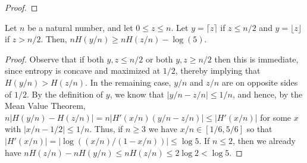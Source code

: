 \documentclass[final, 12pt]{colt2018}
\theoremstyle{definition}
\theoremstyle{plain}
\begin{document}
\begin{proof}
\begin{comment}
By Lemma~\ref{lemma:entropy-rounding}
we know that %
\[ \sum_a |V_a| (H(y_a/|V_a|) - H(z_a)) \le 2^{2s} \log 5. \]
Also we have from our bound on $|d_i|$ that
\begin{align*}
\sum_i |d_i| |r'(y) c'(y) - r'(zn)c'(zn)| 
&\le \sum_i |d_i| (|r'(y)||c'(y) - c'(zn)| + |c'(zn)||r'(y) - r'(zn)|) \\
&\le \sum_i 4|d_i|n \le \frac{4\sqrt{27} s J_T}{n \sqrt{\Delta}}
\end{align*}
Similar to above we see by Lemma~\ref{lemma:gamma-def} our bound on $|d_i|$ that
\begin{align*}
\sum_i d_i|r'(y) c'(y) - r' c'| 
&\le \sum_i d_i|r'(zn) c'(zn) - r' c'| + \sum_i d_i |r'(y) c'(y) - r'(zn)c'(zn)| \\
&\le \epsilon J_T/2 + \frac{4\sqrt{27} s J_T}{n \sqrt{\Delta}}
\end{align*}
and so by \eqref{z''-below}
\begin{align*}
\log M
&\le \sum_i r'(y)_i c'(y)_i d_i + \sum_a |V_a| H(y_a/V_a) + \epsilon J_T/2 + \frac{4\sqrt{27} s J_T}{n \sqrt{\Delta}} + O(2^{2s}) \\
&\le \log Z'' + \epsilon J_T/2 + \frac{4\sqrt{27} s J_T}{n \sqrt{\Delta}} + O(2^{2s})
\end{align*}

Combining our bounds on $\log M$ we find that
\[ |\log M - \log Z''| \le \epsilon J_T/2 + \frac{4\sqrt{27} s J_T}{n \sqrt{\Delta}}| + O(2^{2s}\log n) + \lambda n. \]
Finally if $n \ge \frac{8 \sqrt{27} s}{\sqrt{\Delta} \epsilon}$ then $\frac{4\sqrt{27} s J_T}{n \sqrt{\Delta}}| \le \epsilon J_T/2$
so we get our desired result.
\end{comment}
\end{proof}
\begin{lemma}\label{lemma:entropy-rounding}
Let $n$ be a natural number, and let $0 \le z \le n$. Let $y = \lceil z \rceil$ if $z \le n/2$
and $y = \lfloor z \rfloor$ if $z > n/2$. Then,
$nH(y/n) \ge nH(z/n) - \log(5)$.
\end{lemma}
\begin{proof}
Observe that if both $y,z \le n/2$ or both $y,z \ge n/2$ then
this is immediate, since entropy is concave and maximized at $1/2$, thereby implying that $H(y/n) > H(z/n)$. In the remaining case, $y/n$ and $z/n$ are on opposite
sides of $1/2$. By the definition of $y$, we know that $|y/n - z/n| \le 1/n$, and hence, by the Mean Value Theorem, $n|H(y/n) - H(z/n)| = n|H'(x/n)(y/n - z/n)| \le |H'(x/n)|$ for some $x$ with $|x/n - 1/2| \le 1/n$.  Thus, if $n \ge 3$ we have $x/n \in [1/6,5/6]$ so that
$|H'(x/n)| = |\log((x/n)/(1 - x/n))| \le \log 5$.
If $n \le 2$, then we already have $nH(z/n) - nH(y/n) \le nH(z/n) \le 2\log2 < \log5$. 
\end{proof}
\end{document}
